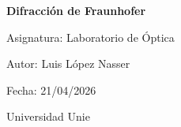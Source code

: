 \documentclass[12pt,a4paper]{article}
\begin{document}
\begin{titlepage}
  \centering
  \vspace*{2cm}
  {\LARGE \textbf{Difracción de Fraunhofer}\par}
  \vspace{1cm}
  {\large Asignatura: Laboratorio de Óptica\par}
  \vspace{0.5cm}
  {\large Autor: Luis López Nasser\par}
  {\large Fecha: 21/04/2026\par}
  \vfill
  {\large Universidad Unie\par}
\end{titlepage}

\tableofcontents
\clearpage
\end{document}
